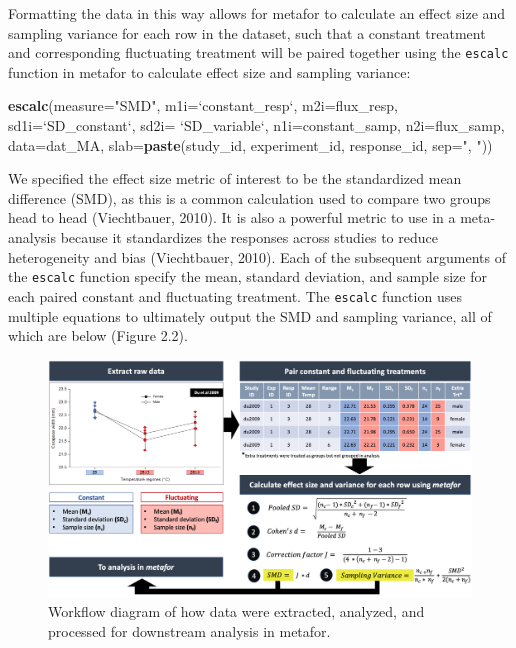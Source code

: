 \documentclass[12pt,twoside]{reedthesis}
\newenvironment{Shaded}{\begin{snugshade}}{\end{snugshade}}
\newcommand{\DataTypeTok}[1]{\textcolor[rgb]{0.13,0.29,0.53}{#1}}
\newcommand{\KeywordTok}[1]{\textcolor[rgb]{0.13,0.29,0.53}{\textbf{#1}}}
\newcommand{\NormalTok}[1]{#1}
\newcommand{\StringTok}[1]{\textcolor[rgb]{0.31,0.60,0.02}{#1}}
\begin{document}
Formatting the data in this way allows for metafor to calculate an effect size and sampling variance for each row in the dataset, such that a constant treatment and corresponding fluctuating treatment will be paired together using the \texttt{escalc} function in metafor to calculate effect size and sampling variance:
\begin{Shaded}
\begin{Highlighting}[]
\KeywordTok{escalc}\NormalTok{(}\DataTypeTok{measure=}\StringTok{"SMD"}\NormalTok{, }\DataTypeTok{m1i=}\StringTok{`}\DataTypeTok{constant_resp}\StringTok{`}\NormalTok{, }\DataTypeTok{m2i=}\NormalTok{flux_resp, }
            \DataTypeTok{sd1i=}\StringTok{`}\DataTypeTok{SD_constant}\StringTok{`}\NormalTok{, }\DataTypeTok{sd2i=} \StringTok{`}\DataTypeTok{SD_variable}\StringTok{`}\NormalTok{, }\DataTypeTok{n1i=}\NormalTok{constant_samp, }
       \DataTypeTok{n2i=}\NormalTok{flux_samp, }\DataTypeTok{data=}\NormalTok{dat_MA, }\DataTypeTok{slab=}\KeywordTok{paste}\NormalTok{(study_id, experiment_id, }
\NormalTok{                                              response_id, }\DataTypeTok{sep=}\StringTok{", "}\NormalTok{))}
\end{Highlighting}
\end{Shaded}
We specified the effect size metric of interest to be the standardized mean difference (SMD), as this is a common calculation used to compare two groups head to head (Viechtbauer, 2010). It is also a powerful metric to use in a meta-analysis because it standardizes the responses across studies to reduce heterogeneity and bias (Viechtbauer, 2010). Each of the subsequent arguments of the \texttt{escalc} function specify the mean, standard deviation, and sample size for each paired constant and fluctuating treatment. The \texttt{escalc} function uses multiple equations to ultimately output the SMD and sampling variance, all of which are below (Figure 2.2).
\begin{figure}
\includegraphics[width=1\linewidth]{figures/figure6} \caption[Workflow of analysis in metafor]{Workflow diagram of how data were extracted, analyzed, and processed for downstream analysis in metafor.}\label{fig:unnamed-chunk-12}
\end{figure}
\end{document}
